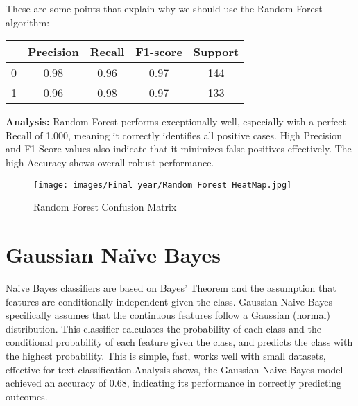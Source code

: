 \documentclass{report}
\begin{document}
{These are some points that explain why we should use the Random Forest algorithm:


\begin{center}
\begin{tabular}{|c|c|c|c|c|}
  \hline
   & Precision & Recall & F1-score & Support \\
  \hline
  0 & 0.98 & 0.96 & 0.97 & 144 \\
  1 & 0.96 & 0.98 & 0.97 & 133 \\
  \hline
\end{tabular}
\end{center}
\textbf{Analysis: }   Random Forest performs exceptionally well, especially with a perfect Recall of 1.000, meaning it correctly identifies all positive cases. High Precision and F1-Score values also indicate that it minimizes false positives effectively. The high Accuracy shows overall robust performance.
\vspace{1cm}
    \begin{figure}[h!]
    \centering
        \texttt{[image: images/Final year/Random Forest HeatMap.jpg]} %
        \caption{Random Forest Confusion Matrix}
    \end{figure}
\section{Gaussian Naïve Bayes}
Naive Bayes classifiers are based on Bayes' Theorem and the assumption that features are conditionally independent given the class. Gaussian Naive Bayes specifically assumes that the continuous features follow a Gaussian (normal) distribution. This classifier calculates the probability of each class and the conditional probability of each feature given the class, and predicts the class with the highest probability.
This is simple, fast, works well with small datasets, effective for text classification.Analysis shows, the Gaussian Naive Bayes model achieved an accuracy of 0.68, indicating its performance in correctly predicting outcomes.

}
\end{document}
